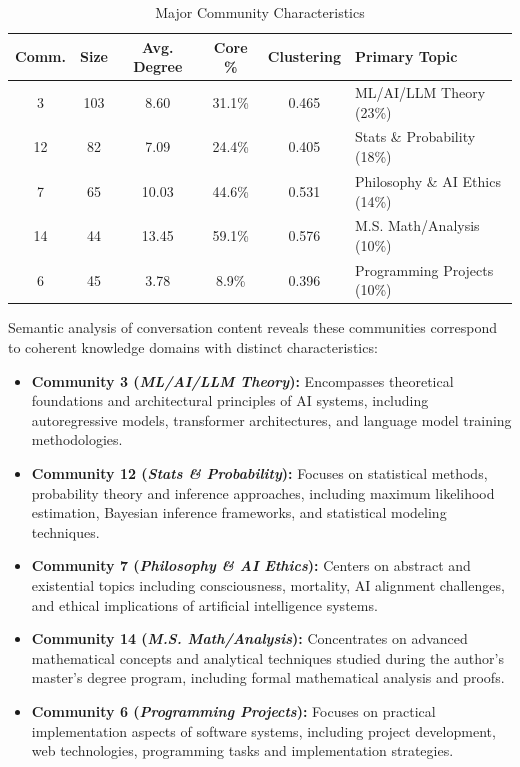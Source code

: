 \documentclass[10pt, a4paper]{article}
\begin{document}
\begin{table}
\centering
\caption{Major Community Characteristics}
\label{tab:communities}
\begin{tabular}{cccccl}
\toprule
\textbf{Comm.} & \textbf{Size} & \textbf{Avg. Degree} & \textbf{Core \%} & \textbf{Clustering} & \textbf{Primary Topic} \\
\midrule
3 & 103 & 8.60 & 31.1\% & 0.465 & ML/AI/LLM Theory (23\%) \\
12 & 82 & 7.09 & 24.4\% & 0.405 & Stats \& Probability (18\%) \\
7 & 65 & 10.03 & 44.6\% & 0.531 & Philosophy \& AI Ethics (14\%) \\
14 & 44 & 13.45 & 59.1\% & 0.576 & M.S. Math/Analysis (10\%) \\
6 & 45 & 3.78 & 8.9\% & 0.396 & Programming Projects (10\%) \\
\bottomrule
\end{tabular}
\end{table}

Semantic analysis of conversation content reveals these communities correspond to coherent knowledge domains with distinct characteristics:
\begin{itemize}
    \item \textbf{Community 3 (\emph{ML/AI/LLM Theory}):} Encompasses theoretical foundations and architectural principles of AI systems, including autoregressive models, transformer architectures, and language model training methodologies.
    
    \item \textbf{Community 12 (\emph{Stats \& Probability}):} Focuses on statistical methods, probability theory and inference approaches, including maximum likelihood estimation, Bayesian inference frameworks, and statistical modeling techniques.
    
    \item \textbf{Community 7 (\emph{Philosophy \& AI Ethics}):} Centers on abstract and existential topics including consciousness, mortality, AI alignment challenges, and ethical implications of artificial intelligence systems.
    
    \item \textbf{Community 14 (\emph{M.S. Math/Analysis}):} Concentrates on advanced mathematical concepts and analytical techniques studied during the author's master's degree program, including formal mathematical analysis and proofs.
    
    \item \textbf{Community 6 (\emph{Programming Projects}):} Focuses on practical implementation aspects of software systems, including project development, web technologies, programming tasks and implementation strategies.
\end{itemize}
\end{document}
